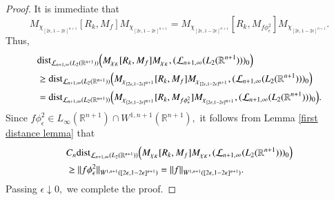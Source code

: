 \documentclass{amsart}
\begin{document}
\begin{proof}
It is immediate that
$$M_{\chi_{[2\epsilon,1-2\epsilon]^{n+1}}}[R_k,M_f]M_{\chi_{[2\epsilon,1-2\epsilon]^{n+1}}}=M_{\chi_{[2\epsilon,1-2\epsilon]^{n+1}}}[R_k,M_{f\phi_{\epsilon}^2}]M_{\chi_{[2\epsilon,1-2\epsilon]^{n+1}}}.$$
Thus,
\begin{align*}
&{\rm dist}_{\mathcal{L}_{n+1,\infty}(L_2(\mathbb{R}^{n+1}))}\Big(M_{\chi_K}[R_k,M_f]M_{\chi_K},(\mathcal{L}_{n+1,\infty}(L_2(\mathbb{R}^{n+1})))_0\Big)\\
&\geq {\rm dist}_{\mathcal{L}_{n+1,\infty}(L_2(\mathbb{R}^{n+1}))}\Big(M_{\chi_{[2\epsilon,1-2\epsilon]^{n+1}}}[R_k,M_f]M_{\chi_{[2\epsilon,1-2\epsilon]^{n+1}}},(\mathcal{L}_{n+1,\infty}(L_2(\mathbb{R}^{n+1})))_0\Big)\\
&={\rm dist}_{\mathcal{L}_{n+1,\infty}(L_2(\mathbb{R}^{n+1}))}\Big(M_{\chi_{[2\epsilon,1-2\epsilon]^{n+1}}}[R_k,M_{f\phi_{\epsilon}^2}]M_{\chi_{[2\epsilon,1-2\epsilon]^{n+1}}},(\mathcal{L}_{n+1,\infty}(L_2(\mathbb{R}^{n+1})))_0\Big).
\end{align*}
Since $f\phi_{\epsilon}^2\in L_{\infty}(\mathbb{R}^{n+1})\cap W^{1,n+1}(\mathbb{R}^{n+1}),$ it follows from Lemma \ref{first distance lemma} that
\begin{align*}
&C_n{\rm dist}_{\mathcal{L}_{n+1,\infty}(L_2(\mathbb{R}^{n+1}))}\Big(M_{\chi_K}[R_k,M_f]M_{\chi_K},(\mathcal{L}_{n+1,\infty}(L_2(\mathbb{R}^{n+1})))_0\Big)\\
&\geq \|f\phi_{\epsilon}^2\|_{\dot{W}^{1,n+1}([2\epsilon,1-2\epsilon]^{n+1})}=\|f\|_{\dot{W}^{1,n+1}([2\epsilon,1-2\epsilon]^{n+1})}.
\end{align*}
Passing $\epsilon\downarrow0,$ we complete the proof.
\end{proof}
%
\end{document}
